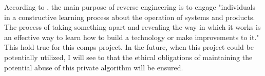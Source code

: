 \documentclass[10pt,twocolumn]{article}
\begin{document}
According to , the main purpose of reverse engineering is to engage "individuals in a constructive learning process about the operation of systems and products. The process of taking something apart and revealing the way in which it works is an effective way to learn how to build a technology or make improvements to it." This hold true for this comps project. In the future, when this project could be potentially utilized, I will see to that the ethical obligations of maintaining the potential abuse of this private algorithm will be ensured.

\printbibliography 
\end{document}
